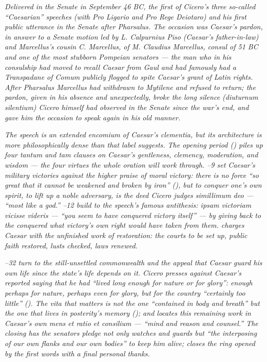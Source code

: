 
\textit{Delivered in the Senate in September 46 BC, the first
of Cicero's three so-called ``Caesarian'' speeches (with
\textit{Pro Ligario} and \textit{Pro Rege Deiotaro}) and his
first public utterance in the Senate after Pharsalus. The
occasion was Caesar's pardon, in answer to a Senate motion
led by L. Calpurnius Piso (Caesar's father-in-law) and
Marcellus's cousin C. Marcellus, of M. Claudius Marcellus,
consul of 51 BC and one of the most stubborn Pompeian
senators --- the man who in his consulship had moved to
recall Caesar from Gaul and had famously had a Transpadane
of Comum publicly flogged to spite Caesar's grant of Latin
rights. After Pharsalus Marcellus had withdrawn to Mytilene
and refused to return; the pardon, given in his absence and
unexpectedly, broke the long silence (\textit{diuturnum
silentium}) Cicero himself had observed in the Senate since
the war's end, and gave him the occasion to speak again in
his old manner.}

\textit{The speech is an extended encomium of Caesar's
\textit{clementia}, but its architecture is more
philosophically dense than that label suggests. The opening
period () piles up four \textit{tantum} and
\textit{tam} clauses on Caesar's gentleness, clemency,
moderation, and wisdom --- the four virtues the whole
oration will work through. --9 set Caesar's
military victories against the higher praise of moral
victory: there is no force ``so great that it cannot be
weakened and broken by iron'' (), but to
conquer one's own spirit, to lift up a noble adversary, is
the deed Cicero judges \textit{simillimum deo} --- ``most
like a god.'' --12 build to the speech's
famous antithesis: \textit{ipsam victoriam vicisse videris}
--- ``you seem to have conquered victory itself'' --- by
giving back to the conquered what victory's own right would
have taken from them.  charges Caesar with
the unfinished work of restoration: the courts to be set
up, public faith restored, lusts checked, laws renewed.}

\textit{--32 turn to the still-unsettled
commonwealth and the appeal that Caesar guard his own life
since the state's life depends on it. Cicero presses against
Caesar's reported saying that he had ``lived long enough for
nature or for glory'': enough perhaps for nature, perhaps
even for glory, but for the country ``certainly too little''
(). The \textit{vita} that matters is not the
one ``contained in body and breath'' but the one that lives
in posterity's memory (); and 
locates this remaining work in Caesar's own
\textit{mens et ratio et consilium} --- ``mind and reason
and counsel.'' The closing  has the senators
pledge not only watches and guards but ``the interposing of
our own flanks and our own bodies'' to keep him alive;
 closes the ring opened by the first words
with a final personal thanks.}

